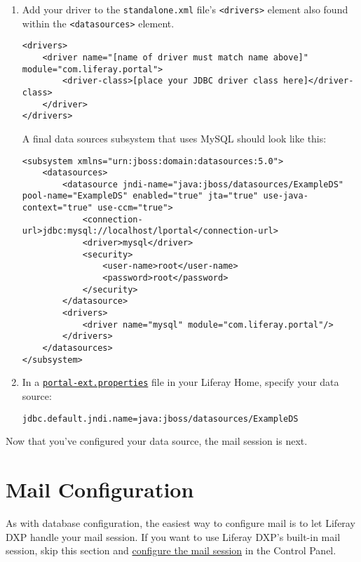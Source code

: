 \begin{enumerate}
\def\labelenumi{\arabic{enumi}.}
\setcounter{enumi}{1}
\item
  Add your driver to the \texttt{standalone.xml} file's
  \texttt{\textless{}drivers\textgreater{}} element also found within
  the \texttt{\textless{}datasources\textgreater{}} element.

\begin{verbatim}
<drivers>
    <driver name="[name of driver must match name above]" module="com.liferay.portal">
        <driver-class>[place your JDBC driver class here]</driver-class>
    </driver>
</drivers>
\end{verbatim}

  A final data sources subsystem that uses MySQL should look like this:

\begin{verbatim}
<subsystem xmlns="urn:jboss:domain:datasources:5.0">
    <datasources>
        <datasource jndi-name="java:jboss/datasources/ExampleDS" pool-name="ExampleDS" enabled="true" jta="true" use-java-context="true" use-ccm="true">
            <connection-url>jdbc:mysql://localhost/lportal</connection-url>
            <driver>mysql</driver>
            <security>
                <user-name>root</user-name>
                <password>root</password>
            </security>
        </datasource>
        <drivers>
            <driver name="mysql" module="com.liferay.portal"/>
        </drivers>
    </datasources>
</subsystem>
\end{verbatim}
\item
  In a
  \href{/docs/7-2/deploy/-/knowledge_base/d/portal-properties}{\texttt{portal-ext.properties}}
  file in your Liferay Home, specify your data source:

\begin{verbatim}
jdbc.default.jndi.name=java:jboss/datasources/ExampleDS
\end{verbatim}
\end{enumerate}

Now that you've configured your data source, the mail session is next.

\section{Mail Configuration}\label{mail-configuration}

As with database configuration, the easiest way to configure mail is to
let Liferay DXP handle your mail session. If you want to use Liferay
DXP's built-in mail session, skip this section and
\href{/docs/7-2/deploy/-/knowledge_base/d/configuring-mail}{configure
the mail session} in the Control Panel.

